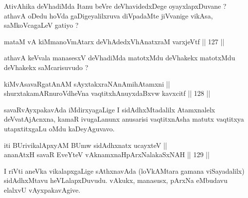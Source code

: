 \begin{artha}
AtivAhika deVhadiMda Itanu beVre deVhavidedxDege
oyayxlapxDuvane ? athavA oDedu hoVda gaDigeyalilxruva diVpadaMte
jiVvanige vikAsa, saMkoVcagaLeV gatiyo ?
\end{artha}


\begin{shl}
mataM vA kiM\footnotemark[4] manoVmAtarx deVhAdedxVhAnatxraM varxjeVtf \hfill || 127 ||  
\end{shl}

\begin{artha}
athavA keVvala manasesxV deVhadiMda matotxMdu deVhakekx
matotxMdu deVhakekx saMcarisuvudo ?
\end{artha}


\begin{shl}
kiMvA\footnotemark[5] savaRgatAnAM sAyxtakxraNAnAmihA\s \s tamxni || \\
shurxtakamARnuroVdheVna vaqtitxhAnuyxdaBxvw kavxcitf \hfill || 128 ||  
\end{shl}

\begin{artha}
savaRvAyxpakavAda iMdirxyagaLige I sidAdhxMtadalilx
Atamxnalelx deVvatAjAcnxna, kamaR ivugaLanunx anusarisi vaqtitxnAsha
matutx vaqtitxya utapxtitxgaLu oMdu kaDeyAguvavo.
\end{artha}


\begin{shl}
iti BUrivikalApxyAM BUmw sidAdhxnatx ucayxteV || \\
ananAtxH savaR EveYteV vAknamxnaHpArxNalakaSxNAH \hfill || 129 ||  
\end{shl}

\begin{artha}
I riVti aneVka vikalapxgaLige sAthxnavAda (loVkAMtara gamana
viSayadalilx) sidAdhxMtavu heVLalapxDuvudu. vAkukx, manasusx, pArxNa
eMbudavu elalxvU vAyxpakavAgive.
\end{artha}

